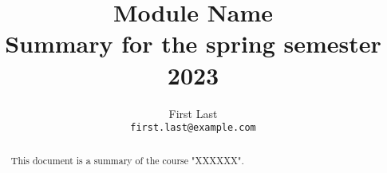 \documentclass[11pt,a4paper]{article}
\begin{document}
\title{Module Name\\
\vspace{30px}
\large{Summary for the spring semester 2023}}
\author{
  First Last\\ \texttt{first.last@example.com}	
}

\maketitle

\begin{abstract}
  \noindent This document is a summary of the course "XXXXXX". 
\end{abstract}

\tableofcontents




\end{document}
